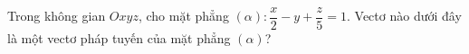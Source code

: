 \begin{ex}
Trong không gian $Oxyz$, cho mặt phẳng $(\alpha)\colon \dfrac{x}{2}-y+\dfrac{z}{5}=1$. Vectơ nào dưới đây là một vectơ pháp tuyến của mặt phẳng $(\alpha)$?
\end{ex}
